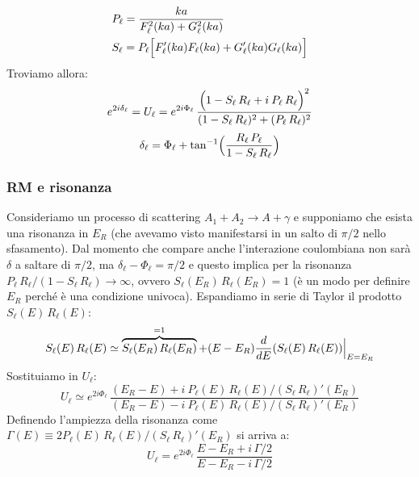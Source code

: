 \begin{displaymath}
	\begin{aligned}
	&P_\ell = \frac{ka}{F_\ell^2 (ka) + G_\ell^2 (ka)}\\ 
	&S_\ell = P_\ell \Bigl [ F_\ell ' (ka) F_\ell (ka) + G_\ell ' (ka)G_\ell (ka) \Bigr ]
	\end{aligned}
\end{displaymath}
Troviamo allora:
$$e^{2i\delta_\ell} = U_\ell = e^{2i\Phi_\ell} \, \frac{\Bigl ( 1-S_\ell\, R_\ell + i\: P_\ell\, R_\ell \Bigr )^2}{(1-S_\ell\, R_\ell)^2 + (P_\ell \, R_\ell)^2}$$
\begin{equation}\label{0412_delta}
\delta_\ell = \Phi_\ell + \tan^{-1} \Bigl ( \frac{R_\ell\, P_\ell}{1-S_\ell\, R_\ell} \Bigr ) 
\end{equation}

\subsubsection{RM e risonanza}
Consideriamo un processo di scattering $A_1 + A_2 \to A + \gamma$ e supponiamo che esista una risonanza in $E_R$ (che avevamo visto manifestarsi in un salto di $\pi/2$ nello sfasamento). Dal momento che compare anche l'interazione coulombiana non sarà $\delta$ a saltare di $\pi/2$, ma $\delta_\ell -\Phi_\ell = \pi/2$ e questo implica per la risonanza $P_\ell\, R_\ell / (1-S_\ell\, R_\ell) \to \infty$, ovvero $S_\ell (E_R)\, R_\ell(E_R) =1 $ (è un modo per definire $E_R$ perché è una condizione univoca). Espandiamo in serie di Taylor il prodotto $S_\ell(E)\, R_\ell(E)$:
$$S_\ell(E)\, R_\ell(E) \simeq \overbrace{S_\ell(E_R)\, R_\ell(E_R)}^{=1} + (E-E_R) \frac{d}{dE}(S_\ell(E)\, R_\ell(E))\Bigl |_{E=E_R}$$
Sostituiamo in $U_\ell$:
$$U_\ell \simeq e^{2i\Phi_\ell} \, \frac{(E_R-E)+i\: P_\ell (E)\, R_\ell (E) /(S_\ell\, R_\ell)' (E_R)}{(E_R-E)- i \: P_\ell (E)\, R_\ell(E) / (S_\ell\,R_\ell)' (E_R)}$$
Definendo l'ampiezza della risonanza come $\Gamma (E) \equiv 2P_\ell (E) \, R_\ell (E) / (S_\ell \, R_\ell)' (E_R)$ si arriva a:
\begin{equation}\label{0412_risUl}
U_\ell = e^{2i\Phi_\ell} \, \frac{E-E_R + i\, \Gamma/2}{E-E_R - i\,\Gamma/2}
\end{equation}

